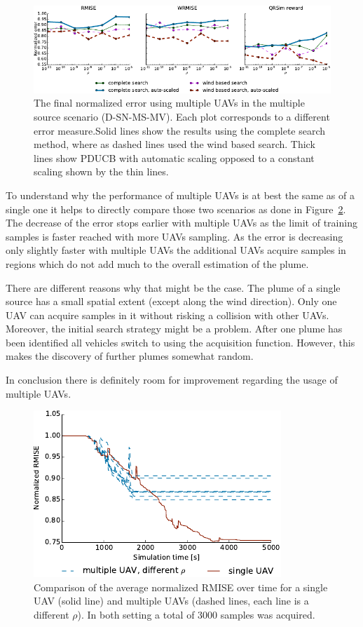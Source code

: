 \begin{figure}
    \centering
    \includegraphics{plots/multiple-uav}
    \caption[Normalized error using multiple UAVs]{The final normalized error 
        using multiple UAVs in the multiple source scenario (D-SN-MS-MV). Each 
        plot corresponds to a different error measure.Solid lines show the 
        results using the complete search method, where as dashed lines used the 
        wind based search.  Thick lines show PDUCB with automatic scaling 
        opposed to a constant scaling shown by the thin 
        lines.}\label{fig:mv-err}
\end{figure}

To understand why the performance of multiple UAVs is at best the same as of 
a single one it helps to directly compare those two scenarios as done in 
Figure~\ref{fig:sv-vs-mv}. The decrease of the error stops earlier with multiple 
UAVs as the limit of training samples is faster reached with more UAVs sampling.  
As the error is decreasing only slightly faster with multiple UAVs the 
additional UAVs acquire samples in regions which do not add much to the overall 
estimation of the plume.

There are different reasons why that might be the case. The plume of a single 
source has a small spatial extent (except along the wind direction). Only one 
UAV can acquire samples in it without risking a collision with other UAVs.  
Moreover, the initial search strategy might be a problem. After one plume has 
been identified all vehicles switch to using the acquisition function. However, 
this makes the discovery of further plumes somewhat random.

In conclusion there is definitely room for improvement regarding the usage of 
multiple UAVs.

\begin{figure}
    \centering
    \includegraphics{plots/sv-vs-mv}
    \caption[Comparing the usage of a single and multiple UAVs.]{Comparison of 
        the average normalized RMISE over time for a single UAV (solid line) and 
        multiple UAVs (dashed lines, each line is a different $\rho$). In both 
        setting a total of \num{3000} samples was acquired.}\label{fig:sv-vs-mv}
\end{figure}
